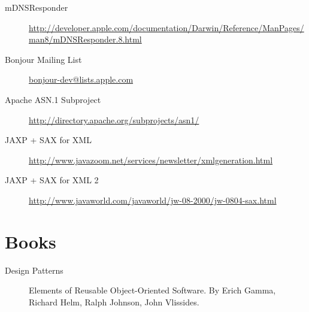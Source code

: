 \begin{description}
 \item[mDNSResponder] \href{http://developer.apple.com/documentation/Darwin/Reference/ManPages/man8/mDNSResponder.8.html}{http://developer.apple.com/documentation/Darwin/Reference/ManPages/man8/mDNSResponder.8.html}
\item[Bonjour Mailing List] \href{bonjour-dev@lists.apple.com}{bonjour-dev@lists.apple.com}   
 \item[Apache ASN.1 Subproject] \href{http://directory.apache.org/subprojects/asn1/}{http://directory.apache.org/subprojects/asn1/}
 \item[JAXP + SAX for XML] \href{http://www.javazoom.net/services/newsletter/xmlgeneration.html}{http://www.javazoom.net/services/newsletter/xmlgeneration.html}
 \item[JAXP + SAX for XML 2] \href{http://www.javaworld.com/javaworld/jw-08-2000/jw-0804-sax.html}{http://www.javaworld.com/javaworld/jw-08-2000/jw-0804-sax.html}
\end{description}


\section{Books}
\begin{description}
 \item[Design Patterns] Elements of Reusable Object-Oriented Software. By Erich Gamma, Richard Helm, Ralph Johnson, John Vlissides.
\end{description}
